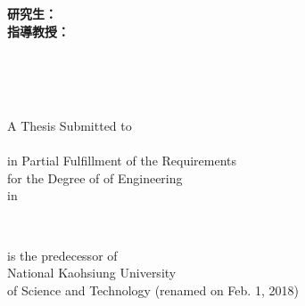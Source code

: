 
\begin{titlepage}
\vspace*{1mm}

\begin{center}

{\LARGE\bfseries  \titletw}
\vspace{15mm}
{\LARGE  \titleen}
\vspace{15mm}

{\large\bfseries{研究生：}\large\authortwname\\
\large\bfseries{指導教授：}\large\supervisortwname}

\vspace{15mm}
{\Large\bfseries{\schooltwname}\\
\vspace{4.5mm}
\Large\bfseries{}\\
\vspace{4.5mm}
\Large\bfseries {}}\\
\vspace{10mm}

\vspace{4.5mm}
A Thesis Submitted to \deptenname\\
\schoolenname\\
in Partial Fulfillment of the Requirements\\
for the Degree of \degreeen of Engineering\\
in \majortwname

\vspace{15mm}
\dateen\\
\schoolenlocation

\vspace{10mm}
\schoolenoldname is the predecessor of\\
National Kaohsiung University\\
of Science and Technology (renamed on Feb. 1, 2018)

\vspace{10mm}
{\large\bfseries{\dateROC}}

\end{center}

\end{titlepage} 